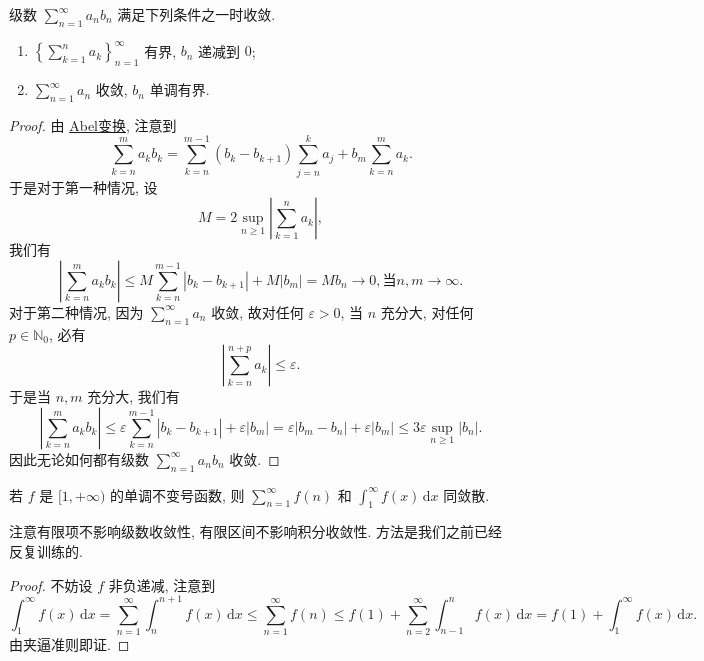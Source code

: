 \documentclass[../../main.tex]{subfiles}
\begin{document}
\begin{theorem}[A-D判别法]
级数 \( \sum_{n=1}^\infty a_n b_n \) 满足下列条件之一时收敛.
\begin{enumerate}
\item \( \left\{ \sum_{k=1}^n a_k \right\}_{n=1}^\infty \) 有界, \( b_n \) 递减到 \( 0 \);

\item \( \sum_{n=1}^\infty a_n \) 收敛, \( b_n \) 单调有界.
\end{enumerate}
\end{theorem}
\begin{proof}
由 \hyperref[theorem:Abel变换]{Abel变换}, 注意到
\[
\sum_{k=n}^m a_k b_k = \sum_{k=n}^{m - 1} (b_k - b_{k + 1}) \sum_{j=n}^k a_j + b_m \sum_{k=n}^m a_k.
\]
于是对于第一种情况, 设
\[
M = 2 \sup_{n \geqslant 1} \left| \sum_{k=1}^n a_k \right|,
\]
我们有
\[
\left| \sum_{k=n}^m a_k b_k \right| \leqslant M \sum_{k=n}^{m - 1} |b_k - b_{k + 1}| + M |b_m| = M b_n \to 0, \text{当} n, m \to \infty.
\]
对于第二种情况, 因为 \( \sum_{n=1}^\infty a_n \) 收敛, 故对任何 \( \varepsilon > 0 \), 当 \( n \) 充分大, 对任何 \( p \in \mathbb{N}_0 \), 必有
\[
\left| \sum_{k=n}^{n + p} a_k \right| \leqslant \varepsilon.
\]
于是当 \( n, m \) 充分大, 我们有
\[
\left| \sum_{k=n}^m a_k b_k \right| \leqslant \varepsilon \sum_{k=n}^{m - 1} |b_k - b_{k + 1}| + \varepsilon |b_m| = \varepsilon |b_m - b_n| + \varepsilon |b_m| \leqslant 3 \varepsilon \sup_{n \geqslant 1} |b_n|.
\]
因此无论如何都有级数 \( \sum_{n=1}^\infty a_n b_n \) 收敛.
\end{proof}

\begin{theorem}[积分判别法]\label{theorem:积分判别法}
若 \( f \) 是 \( [1, +\infty) \) 的单调不变号函数, 则 \( \sum_{n=1}^\infty f(n) \) 和 \( \int_1^\infty f(x) \, \mathrm{d}x \) 同敛散.
\end{theorem}
\begin{note}
注意有限项不影响级数收敛性, 有限区间不影响积分收敛性. 方法是我们之前已经反复训练的.
\end{note}
\begin{proof}
不妨设 \( f \) 非负递减, 注意到
\[
\int_1^\infty f(x) \, \mathrm{d}x = \sum_{n=1}^\infty \int_n^{n + 1} f(x) \, \mathrm{d}x \leqslant \sum_{n=1}^\infty f(n) \leqslant f(1) + \sum_{n=2}^\infty \int_{n - 1}^n f(x) \, \mathrm{d}x = f(1) + \int_1^\infty f(x) \, \mathrm{d}x.
\]
由夹逼准则即证.
\end{proof}
\end{document}
